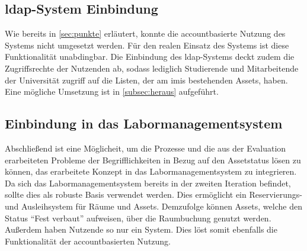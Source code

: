 \subsection{\ac{ldap}-System Einbindung}
Wie bereits in \ref{sec:punkte} erläutert, konnte die accountbasierte Nutzung des Systems nicht
umgesetzt werden. Für den realen Einsatz des Systems ist diese Funktionalität unabdingbar. Die
Einbindung des  \ac{ldap}-Systems deckt zudem die Zugriffsrechte der Nutzenden ab, sodass lediglich
Studierende und Mitarbeitende der Universität zugriff auf die Listen, der am \ac{imis} bestehenden Assets, haben. Eine
mögliche Umsetzung ist in \ref{subsec:heraus} aufgeführt.

\subsection{Einbindung in das Labormanagementsystem}
Abschließend ist eine Möglicheit, um die Prozesse und die aus der Evaluation
erarbeiteten Probleme der Begrifflichkeiten in Bezug auf den Assetstatus lösen
zu können, das erarbeitete Konzept in das Labormanagementsystem zu  integrieren. Da sich das Labormanagementsystem bereits in der zweiten
Iteration befindet, sollte dies als robuste Basis verwendet werden. Dies
ermöglicht ein Reservierungs- und Ausleihsystem für Räume und Assets. Demzufolge
können Assets, welche den Status \enquote{Fest verbaut} aufweisen, über die
Raumbuchung genutzt werden. Außerdem haben Nutzende so nur ein System. Dies löst
somit ebenfalls die Funktionalität der accountbasierten Nutzung.


